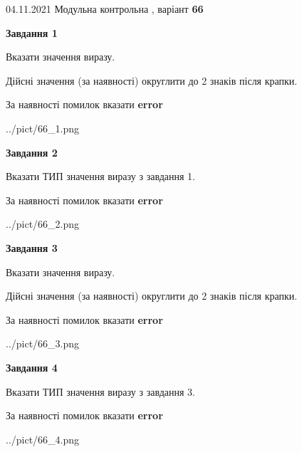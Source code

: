 \documentclass[11pt, ukrainian]{article}
\begin{document}
{04.11.2021 Модульна контрольна , варіант  \No \textbf { 66 }\par}
{
\begin {large}
{\begin {center}\textbf{Завдання 1}\end {center}}\par
Вказати значення виразу. \par
Дійсні значення (за наявності) округлити до 2 знаків після крапки. \par
За наявності помилок вказати \textbf{error}

\begin{center}
	{../pict/66_1.png}
\end{center}
\newpage

{\begin {center}\textbf{Завдання 2}\end {center}}\par
Вказати ТИП значення виразу з завдання 1. \par
За наявності помилок вказати \textbf{error}

\begin{center}
	{../pict/66_2.png}
\end{center}
\newpage

{\begin {center}\textbf{Завдання 3}\end {center}}\par
Вказати значення виразу. \par
Дійсні значення (за наявності) округлити до 2 знаків після крапки. \par
За наявності помилок вказати \textbf{error}

\begin{center}
	{../pict/66_3.png}
\end{center}
\newpage

{\begin {center}\textbf{Завдання 4}\end {center}}\par
Вказати ТИП значення виразу з завдання 3. \par
За наявності помилок вказати \textbf{error}

\begin{center}
	{../pict/66_4.png}
\end{center}
\newpage


\end{large}}
\end{document}
